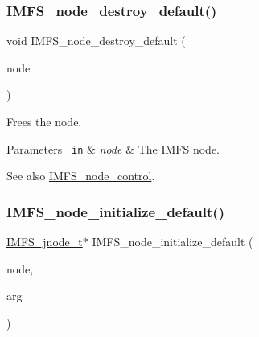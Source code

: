  \mbox{\label{group__IMFSGenericNodes_gaec999106a1cb28b45a46896fce71f320}} 
\subsubsection{\texorpdfstring{IMFS\_node\_destroy\_default()}{IMFS\_node\_destroy\_default()}}
{\footnotesize\ttfamily void I\+M\+F\+S\+\_\+node\+\_\+destroy\+\_\+default (\begin{DoxyParamCaption}\item[{\mbox{\hyperlink{structIMFS__jnode__tt}{I\+M\+F\+S\+\_\+jnode\+\_\+t}} $\ast$}]{node }\end{DoxyParamCaption})}



Frees the node. 


\begin{DoxyParams}[1]{Parameters}
\mbox{\texttt{ in}}  & {\em node} & The I\+M\+FS node.\\
\hline
\end{DoxyParams}
\begin{DoxySeeAlso}{See also}
\mbox{\hyperlink{structIMFS__node__control}{I\+M\+F\+S\+\_\+node\+\_\+control}}. 
\end{DoxySeeAlso}
\mbox{\label{group__IMFSGenericNodes_gab52e16c2a7d9bac5234d44954a044f24}} 
\subsubsection{\texorpdfstring{IMFS\_node\_initialize\_default()}{IMFS\_node\_initialize\_default()}}
{\footnotesize\ttfamily \mbox{\hyperlink{structIMFS__jnode__tt}{I\+M\+F\+S\+\_\+jnode\+\_\+t}}$\ast$ I\+M\+F\+S\+\_\+node\+\_\+initialize\+\_\+default (\begin{DoxyParamCaption}\item[{\mbox{\hyperlink{structIMFS__jnode__tt}{I\+M\+F\+S\+\_\+jnode\+\_\+t}} $\ast$}]{node,  }\item[{void $\ast$}]{arg }\end{DoxyParamCaption})}



